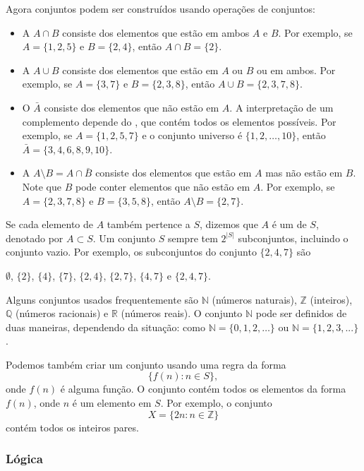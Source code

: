 \begin{samepage}
Agora conjuntos podem ser construídos usando operações de conjuntos:
\begin{itemize}
\item A  $A \cap B$ consiste dos elementos que estão em ambos
$A$ e $B$.
Por exemplo, se $A=\{1,2,5\}$ e $B=\{2,4\}$,
então $A \cap B = \{2\}$.
\item A  $A \cup B$ consiste dos elementos
que estão em $A$ ou $B$ ou em ambos.
Por exemplo, se $A=\{3,7\}$ e $B=\{2,3,8\}$,
então $A \cup B = \{2,3,7,8\}$.
\item O  $\bar A$ consiste dos elementos
que não estão em $A$.
A interpretação de um complemento depende do
, que contém todos os elementos possíveis.
Por exemplo, se $A=\{1,2,5,7\}$ e o conjunto universo é
$\{1,2,\ldots,10\}$, então $\bar A = \{3,4,6,8,9,10\}$.
\item A  $A \setminus B = A \cap \bar B$
consiste dos elementos que estão em $A$ mas não estão em $B$.
Note que $B$ pode conter elementos que não estão em $A$.
Por exemplo, se $A=\{2,3,7,8\}$ e $B=\{3,5,8\}$,
então $A \setminus B = \{2,7\}$.
\end{itemize}
\end{samepage}

Se cada elemento de $A$ também pertence a $S$,
dizemos que $A$ é um  de $S$,
denotado por $A \subset S$.
Um conjunto $S$ sempre tem $2^{|S|}$ subconjuntos,
incluindo o conjunto vazio.
Por exemplo, os subconjuntos do conjunto $\{2,4,7\}$ são
\begin{center}
$\emptyset$,
$\{2\}$, $\{4\}$, $\{7\}$, $\{2,4\}$, $\{2,7\}$, $\{4,7\}$ e $\{2,4,7\}$.
\end{center}

Alguns conjuntos usados frequentemente são
$\mathbb{N}$ (números naturais),
$\mathbb{Z}$ (inteiros),
$\mathbb{Q}$ (números racionais) e
$\mathbb{R}$ (números reais).
O conjunto $\mathbb{N}$
pode ser definidos de duas maneiras, dependendo
da situação:
como $\mathbb{N}=\{0,1,2,\ldots\}$
ou $\mathbb{N}=\{1,2,3,...\}$.

Podemos também criar um conjunto usando uma regra da forma
\[\{f(n) : n \in S\},\]
onde $f(n)$ é alguma função.
O conjunto contém todos os elementos da forma $f(n)$,
onde $n$ é um elemento em $S$.
Por exemplo, o conjunto
\[X=\{2n : n \in \mathbb{Z}\}\]
contém todos os inteiros pares.

\subsubsection{Lógica}

